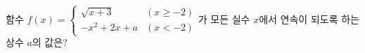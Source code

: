 함수 $f(x)=\begin{cases} \sqrt{x+3} & (x\ge -2) \\ -x^2+2x+a & (x<-2) \end{cases}$가 모든 실수 $x$에서 연속이 되도록 하는 상수 $a$의 값은?
